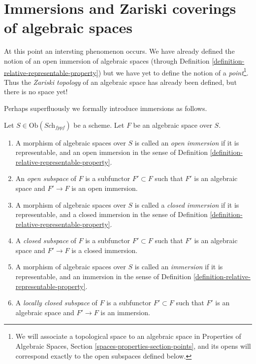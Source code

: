 \section{Immersions and Zariski coverings of algebraic spaces}
\label{section-Zariski}

\noindent
At this point an intersting phenomenon occurs. We have already defined
the notion of an open immersion of algebraic spaces (through
Definition \ref{definition-relative-representable-property})
but we have yet to define the notion of a {\it point}\footnote{We
will associate a topological space to an algebraic space in
Properties of Algebraic Spaces, Section \ref{spaces-properties-section-points},
and its opens will correspond exactly to the open subspaces defined below.}.
Thus the {\it Zariski topology} of an algebraic space
has already been defined, but there is no space yet!

\medskip\noindent
Perhaps superfluously we formally introduce immersions as follows.

\begin{definition}
\label{definition-immersion}
Let $S \in \text{Ob}(\textit{Sch}_{fppf})$ be a scheme.
Let $F$ be an algebraic space over $S$.
\begin{enumerate}
\item A morphism of algebraic spaces over $S$
is called an {\it open immersion} if it is representable, and an open immersion
in the sense of Definition \ref{definition-relative-representable-property}.
\item An {\it open subspace} of $F$ is a subfunctor $F' \subset F$
such that $F'$ is an algebraic space and $F' \to F$ is an
open immersion.
\item A morphism of algebraic spaces over $S$
is called a {\it closed immersion} if it is representable, and a closed
immersion in the sense of
Definition \ref{definition-relative-representable-property}.
\item A {\it closed subspace} of $F$ is a subfunctor $F' \subset F$
such that $F'$ is an algebraic space and $F' \to F$ is a
closed immersion.
\item A morphism of algebraic spaces over $S$
is called an {\it immersion} if it is representable, and an immersion
in the sense of Definition \ref{definition-relative-representable-property}.
\item A {\it locally closed subspace} of $F$ is a subfunctor $F' \subset F$
such that $F'$ is an algebraic space and $F' \to F$ is an
immersion.
\end{enumerate}
\end{definition}


